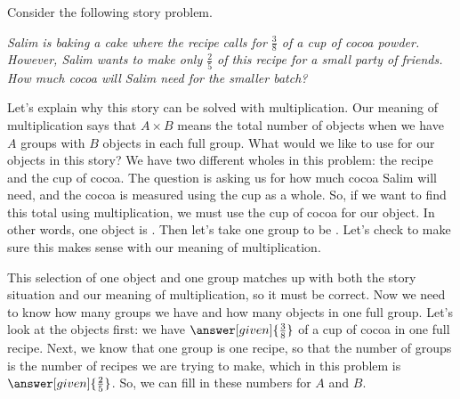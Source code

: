 \documentclass{ximera}
\begin{document}
\begin{example}
Consider the following story problem. 

\emph{Salim is baking a cake where the recipe calls for $\frac{3}{8}$ of a cup of cocoa powder. However, Salim wants to make only $\frac{2}{5}$ of this recipe for a small party of friends. How much cocoa will Salim need for the smaller batch?}

Let's explain why this story can be solved with multiplication. Our meaning of multiplication says that $A \times B$ means the total number of objects when we have $A$ groups with $B$ objects in each full group. What would we like to use for our objects in this story? We have two different wholes in this problem: the recipe and the cup of cocoa. The question is asking us for how much cocoa Salim will need, and the cocoa is measured using the cup as a whole. So, if we want to find this total using multiplication, we must use the cup of cocoa for our object. In other words, one object is . Then let's take one group to be . Let's check to make sure this makes sense with our meaning of multiplication.

\begin{image}
\end{image}
This selection of one object and one group matches up with both the story situation and our meaning of multiplication, so it must be correct. Now we need to know how many groups we have and how many objects in one full group. Let's look at the objects first: we have $\answer[given]{\frac{3}{8}}$ of a cup of cocoa in one full recipe.  Next, we know that one group is one recipe, so that the number of groups is the number of recipes we are trying to make, which in this problem is $\answer[given]{\frac{2}{5}}$. So, we can fill in these numbers for $A$ and $B$.

\begin{image}
\end{image}
\end{example}
\end{document}
